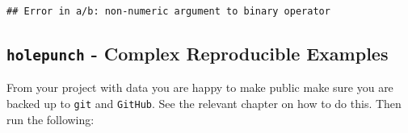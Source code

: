 \documentclass[]{book}
\newenvironment{Shaded}{\begin{snugshade}}{\end{snugshade}}
\newcommand{\CommentTok}[1]{\textcolor[rgb]{0.56,0.35,0.01}{\textit{#1}}}
\newcommand{\DataTypeTok}[1]{\textcolor[rgb]{0.13,0.29,0.53}{#1}}
\newcommand{\DecValTok}[1]{\textcolor[rgb]{0.00,0.00,0.81}{#1}}
\newcommand{\KeywordTok}[1]{\textcolor[rgb]{0.13,0.29,0.53}{\textbf{#1}}}
\newcommand{\NormalTok}[1]{#1}
\newcommand{\OperatorTok}[1]{\textcolor[rgb]{0.81,0.36,0.00}{\textbf{#1}}}
\newcommand{\OtherTok}[1]{\textcolor[rgb]{0.56,0.35,0.01}{#1}}
\newcommand{\StringTok}[1]{\textcolor[rgb]{0.31,0.60,0.02}{#1}}
\begin{document}
\begin{Shaded}
\end{Shaded}

\begin{verbatim}
## Error in a/b: non-numeric argument to binary operator
\end{verbatim}

\hypertarget{holepunch---complex-reproducible-examples}{%
\subsection{\texorpdfstring{\texttt{holepunch} - Complex Reproducible Examples}{holepunch - Complex Reproducible Examples}}\label{holepunch---complex-reproducible-examples}}

From your project with data you are happy to make public make sure you are backed up to \texttt{git} and \texttt{GitHub}. See the relevant chapter on how to do this. Then run the following:
\end{document}

